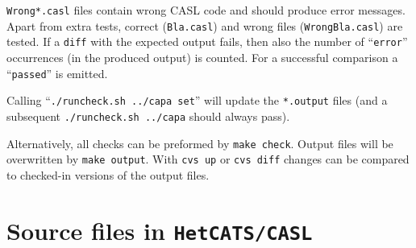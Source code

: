 \documentclass{article}
\begin{document}
\texttt{Wrong*.casl} files contain wrong CASL code and should produce
error messages. Apart from extra tests, correct (\texttt{Bla.casl})
and wrong files (\texttt{WrongBla.casl}) are tested. If a \texttt{diff}
with the expected output fails, then also the number of
``\texttt{error}'' occurrences (in the produced output) is counted. For a
successful comparison a ``\texttt{passed}'' is emitted.

Calling ``\texttt{./runcheck.sh ../capa set}'' will update the
\texttt{*.output} files (and a subsequent \texttt{./runcheck.sh ../capa} should
always pass). 

Alternatively, all checks can be preformed by \texttt{make check}. Output
files will be overwritten by \texttt{make output}. With \texttt{cvs up} or
\texttt{cvs diff} changes can be compared to checked-in versions of the output
files.

\section{Source files in \texttt{HetCATS/CASL}}
\end{document}
